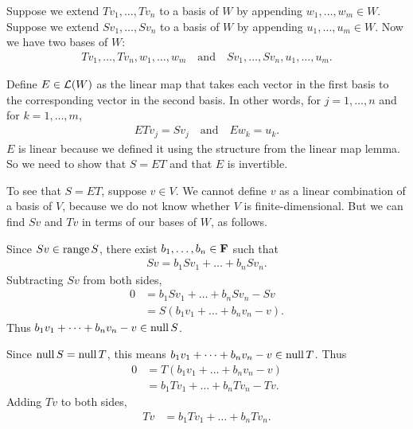 \documentclass[a5paper]{article}
\begin{document}

    Suppose we extend $Tv_1,\dots,Tv_n$ to a basis of $W$ by appending $w_1,\dots,w_m \in W$.
    Suppose we extend $Sv_1,\dots,Sv_n$ to a basis of $W$ by appending $u_1,\dots,u_m \in W$.
    Now we have two bases of $W$:
\begin{align*}
        Tv_1,\dots,Tv_n,w_1,\dots,w_m \quad\text{and}\quad Sv_1,\dots,Sv_n,u_1,\dots,u_m .
\end{align*}

    Define $E \in \mathcal{L}(W)$ as the linear map that takes each vector in the first basis to the corresponding vector in the second basis.
    In other words, for $j = 1,\dots,n$ and for $k = 1,\dots,m$,
\begin{align*}
        ETv_j = Sv_j \quad\text{and}\quad Ew_k = u_k .
\end{align*}
    $E$ is linear because we defined it using the structure from the linear map lemma.
    So we need to show that $S = ET$ and that $E$ is invertible.

    To see that $S = ET$, suppose $v \in V$.
    We cannot define $v$ as a linear combination of a basis of $V$, because we do not know whether $V$ is finite-dimensional.
    But we can find $Sv$ and $Tv$ in terms of our bases of $W$, as follows.

    Since $Sv \in \operatorname{range}S$, there exist $b_1,\dots,b_n \in \mathbf{F}$ such that
\begin{align*}
        Sv = b_1 Sv_1 + \dots + b_n Sv_n .
\end{align*}
    Subtracting $Sv$ from both sides,
\begin{align*}
        0 &= b_1 Sv_1 + \dots + b_n Sv_n - Sv \\
          &= S( b_1 v_1 + \dots + b_n v_n - v ) .
\end{align*}
    Thus $b_1v_1+\dots+b_nv_n-v \in \operatorname{null}S$.

    Since $\operatorname{null}S = \operatorname{null}T$, this means $b_1v_1+\dots+b_nv_n-v \in \operatorname{null}T$.
    Thus
\begin{align*}
        0 &= T( b_1 v_1 + \dots + b_n v_n - v ) \\
          &= b_1 T v_1 + \dots + b_n T v_n - Tv .
\end{align*}
    Adding $Tv$ to both sides,
\begin{align*}
        Tv &= b_1 T v_1 + \dots + b_n T v_n .
\end{align*}
\end{document}
